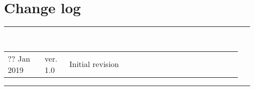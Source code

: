 \section*{\LARGE Change log}%
%
  \rule{\textwidth}{1.0pt}\\[5pt]%
  \begin{tabular}{>{\raggedright}p{0.15\linewidth}p{0.1\linewidth}p{0.7\linewidth}}
  	?? Jan 2019 & ver. 1.0 & Initial revision
  \end{tabular}\newline%
 \rule{\textwidth}{1.0pt}
